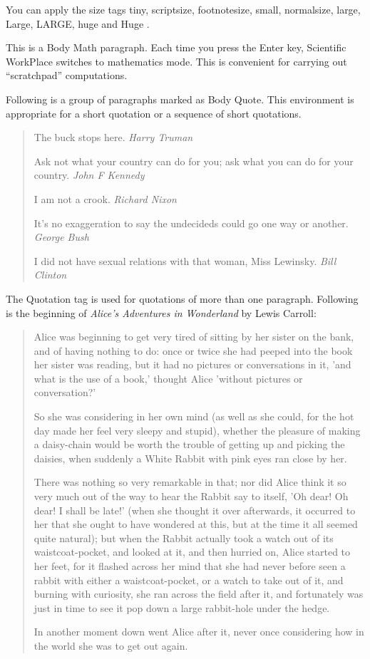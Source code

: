 \documentclass{article}
\begin{document}
You can apply the size tags {\tiny tiny}, {\scriptsize scriptsize}, 
{\footnotesize footnotesize}, {\small small}, {\normalsize normalsize}, 
{\large large}, {\Large Large}, {\LARGE LARGE}, {\huge huge} and {\Huge Huge}%
.

This is a Body Math paragraph. Each time you press the Enter key, Scientific
WorkPlace switches to mathematics mode. This is convenient for carrying out
``scratchpad'' computations.

Following is a group of paragraphs marked as Body Quote. This environment is
appropriate for a short quotation or a sequence of short quotations.

\begin{quote}
The buck stops here. \emph{Harry Truman}

Ask not what your country can do for you; ask what you can do for your
country. \emph{John F Kennedy}

I am not a crook. \emph{Richard Nixon}

It's no exaggeration to say the undecideds could go one way or another. 
\emph{George Bush}

I did not have sexual relations with that woman, Miss Lewinsky. \emph{Bill
Clinton}
\end{quote}

The Quotation tag is used for quotations of more than one paragraph.
Following is the beginning of \emph{Alice's Adventures in Wonderland }by
Lewis Carroll:

\begin{quotation}
Alice was beginning to get very tired of sitting by her sister on the bank,
and of having nothing to do: once or twice she had peeped into the book her
sister was reading, but it had no pictures or conversations in it, 'and what
is the use of a book,' thought Alice 'without pictures or conversation?'

So she was considering in her own mind (as well as she could, for the hot
day made her feel very sleepy and stupid), whether the pleasure of making a
daisy-chain would be worth the trouble of getting up and picking the
daisies, when suddenly a White Rabbit with pink eyes ran close by her.

There was nothing so very remarkable in that; nor did Alice think it so very
much out of the way to hear the Rabbit say to itself, 'Oh dear! Oh dear! I
shall be late!' (when she thought it over afterwards, it occurred to her
that she ought to have wondered at this, but at the time it all seemed quite
natural); but when the Rabbit actually took a watch out of its
waistcoat-pocket, and looked at it, and then hurried on, Alice started to
her feet, for it flashed across her mind that she had never before seen a
rabbit with either a waistcoat-pocket, or a watch to take out of it, and
burning with curiosity, she ran across the field after it, and fortunately
was just in time to see it pop down a large rabbit-hole under the hedge.

In another moment down went Alice after it, never once considering how in
the world she was to get out again.
\end{quotation}
\end{document}
